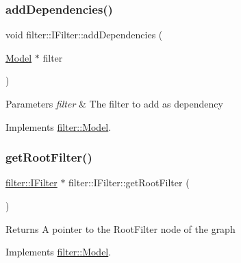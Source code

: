\subsubsection{\texorpdfstring{add\+Dependencies()}{addDependencies()}}
{\footnotesize\ttfamily void filter\+::\+I\+Filter\+::add\+Dependencies (\begin{DoxyParamCaption}\item[{\hyperlink{classfilter_1_1_model}{Model} $\ast$}]{filter }\end{DoxyParamCaption})\hspace{0.3cm}{\ttfamily [virtual]}}


\begin{DoxyParams}{Parameters}
{\em filter} & The filter to add as dependency \\
\hline
\end{DoxyParams}


Implements \hyperlink{classfilter_1_1_model}{filter\+::\+Model}.

\mbox{\label{classfilter_1_1_i_filter_a97fdc1892c15c918287c83263d069147}} 
\subsubsection{\texorpdfstring{get\+Root\+Filter()}{getRootFilter()}}
{\footnotesize\ttfamily \hyperlink{classfilter_1_1_i_filter}{filter\+::\+I\+Filter} $\ast$ filter\+::\+I\+Filter\+::get\+Root\+Filter (\begin{DoxyParamCaption}{ }\end{DoxyParamCaption})\hspace{0.3cm}{\ttfamily [virtual]}}

\begin{DoxyReturn}{Returns}
A pointer to the Root\+Filter node of the graph 
\end{DoxyReturn}


Implements \hyperlink{classfilter_1_1_model}{filter\+::\+Model}.

\mbox{\label{classfilter_1_1_i_filter_ab99902b060a6d9edc3452a8c9f85e37e}} 
